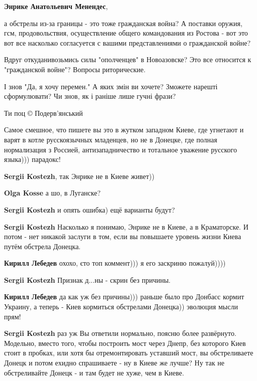\begin{itemize}
\begin{itemize}
\textbf{Энрике Анатольевич Менендес}, 

а обстрелы из-за границы - это тоже гражданская война? А поставки оружия, гсм,
продовольствия, осуществление общего командования из Ростова - вот это вот все
насколько согласуется с вашими представлениями о гражданской войне?

Вдруг откуданивозьмись силы "ополченцев" в Новоазовске? Это все относится к
"гражданской войне"? Вопросы риторические.

\end{itemize} %

І знов "Да, я хочу перемен."
А яких змін ви хочете? Зможете нарешті сформулювати? Чи знов, як і раніше лише гучні фрази?

Ти поц
© Подерв'янський


Самое смешное, что пишете вы это в жутком западном Киеве, где угнетают и варят
в котле русскоязычных младенцев, но не в Донецке, где полная нормализация з
Россией, антизападничество и тотальное уважение русского языка))) парадокс!

\begin{itemize} %
\textbf{Sergii Kostezh}, так Энрике не в Киеве живет))

\textbf{Olga Kosse} а шо, в Луганске?

\textbf{Sergii Kostezh} и опять ошибка) ещё варианты будут?

\textbf{Sergii Kostezh} Насколько я понимаю, Энрике не в Киеве, а в Краматорске. И потом - нет никакой заслуги в том, если вы повышаете уровень жизни Киева путём обстрела Донецка.

\textbf{Кирилл Лебедев} охохо, єто топ коммент))) я его заскриню пожалуй))))

\textbf{Sergii Kostezh} Признак д...ны - скрин без причины.

\textbf{Кирилл Лебедев} да как уж без причины))) раньше было про Донбасс кормит Украину, а теперь - Киев кормиться обстрелами Донецка)) эволюция мысли прям!

\textbf{Sergii Kostezh} раз уж Вы ответили нормально, поясню более развёрнуто. Модельно, вместо того, чтобы построить мост через Днепр, без которого Киев стоит в пробках, или хотя бы отремонтировать уставший мост, вы обстреливаете Донецк и потом ехидно спрашиваете - ну в Киеве же лучше? Ну так не обстреливайте Донецк - и там будет не хуже, чем в Киеве.


\end{itemize}
\end{itemize}
